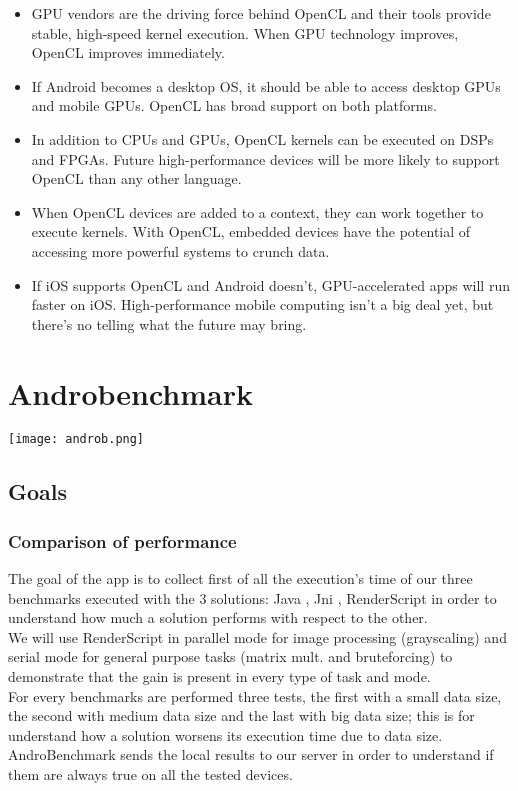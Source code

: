 \documentclass[11pt,english]{article}
\begin{document}
\begin{itemize}
\item  GPU vendors are the driving force behind OpenCL and their tools provide stable, high-speed kernel execution. When GPU technology improves, OpenCL improves immediately.
\item If Android becomes a desktop OS, it should be able to access desktop GPUs and mobile GPUs. OpenCL has broad support on both platforms.
\item In addition to CPUs and GPUs, OpenCL kernels can be executed on DSPs and FPGAs. Future high-performance devices will be more likely to support OpenCL than any other language.
\item When OpenCL devices are added to a context, they can work together to execute kernels. With OpenCL, embedded devices have the potential of accessing more powerful systems to crunch data.
\item If iOS supports OpenCL and Android doesn't, GPU-accelerated apps will run faster on iOS. High-performance mobile computing isn't a big deal yet, but there's no telling what the future may bring.
\end{itemize}

\section{Androbenchmark}
\begin{center}
\texttt{[image: androb.png]}
\end{center}
\subsection{Goals}
\subsubsection{Comparison of performance}
The goal of the app is to collect first of all the execution's time of our three benchmarks executed with the 3 solutions: Java , Jni , RenderScript in order to understand how much a solution performs with respect to the other.\\We will use RenderScript in parallel mode for image processing (grayscaling) and serial mode for general purpose tasks (matrix mult. and bruteforcing) to demonstrate that the gain is present in every type of task and mode.\\
For every benchmarks are performed three tests, the first with a small data size, the second with medium data size and the last with big data size; this is for understand how a solution worsens its execution time due to data size.
AndroBenchmark sends the local results to our server in order to understand if them are always true on all the tested devices.
\end{document}
